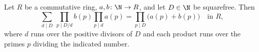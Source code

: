 Let $R$ be a commutative ring, $a,b\colon\N\to R$, and let $D\in\N$ be squarefree. Then
\[
  \sum_{d\mid D}\ \prod_{p\mid D/d}b(p)\prod_{p\mid d}a(p)=\prod_{p\mid D}\bigl(a(p)+b(p)\bigr)\quad\text{in }R,
\]
where $d$ runs over the positive divisors of $D$ and each product runs over the primes $p$ dividing the indicated number.
